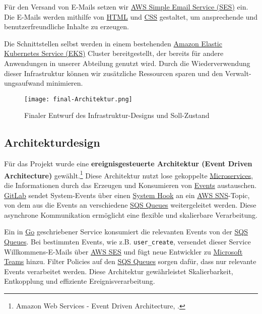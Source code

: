 Für den Versand von E-Mails setzen wir \hyperlink{SES}{\textcolor{AOBlau}{AWS Simple Email Service (SES)}} ein. Die E-Mails werden mithilfe von \hyperlink{HTML}{\textcolor{AOBlau}{HTML}} und \hyperlink{CSS}{\textcolor{AOBlau}{CSS}} gestaltet, um ansprechende und benutzerfreundliche Inhalte zu erzeugen.

Die Schnittstellen selbst werden in einem bestehenden \hyperlink{EKS}{\textcolor{AOBlau}{Amazon Elastic Kubernetes Service (EKS)}} Cluster bereitgestellt, der bereits für andere Anwendungen in unserer Abteilung genutzt wird. Durch die Wiederverwendung dieser Infrastruktur können wir zusätzliche Ressourcen sparen und den Verwalt-
ungsaufwand minimieren.

\begin{figure}[H]
	\centering
	\texttt{[image: final-Architektur.png]}
	\caption{Finaler Entwurf des Infrastruktur-Designs und Soll-Zustand}
\end{figure}

\clearpage
\subsection{Architekturdesign}
\label{sec:Architekturdesign}

Für das Projekt wurde eine \textbf{ereignisgesteuerte Architektur (Event Driven Architecture)} gewählt.\footnote{Amazon Web Services - Event Driven Architecture, \cite{awsEDA}.} Diese Architektur nutzt lose gekoppelte \hyperlink{Microservices}{\textcolor{AOBlau}{Microservices}}, die Informationen durch das Erzeugen und Konsumieren von \hyperlink{GitLabEvent}{\textcolor{AOBlau}{Events}} austauschen. \hyperlink{GitLab}{\textcolor{AOBlau}{GitLab}} sendet System-Events über einen \hyperlink{GitLabSystemhooks}{\textcolor{AOBlau}{System Hook}} an ein \hyperlink{SNS}{\textcolor{AOBlau}{AWS SNS}}-Topic, von dem aus die Events an verschiedene \hyperlink{SQS}{\textcolor{AOBlau}{SQS Queues}} weitergeleitet werden. Diese asynchrone Kommunikation ermöglicht eine flexible und skalierbare Verarbeitung.

Ein in \hyperlink{Go}{\textcolor{AOBlau}{Go}} geschriebener Service konsumiert die relevanten Events von der \hyperlink{SQS}{\textcolor{AOBlau}{SQS Queues}}. Bei bestimmten Events, wie z.B. \texttt{user\_create}, versendet dieser Service Willkommens-E-Mails über \hyperlink{SES}{\textcolor{AOBlau}{AWS SES}} und fügt neue Entwickler zu \hyperlink{MicrosoftTeams}{\textcolor{AOBlau}{Microsoft Teams}} hinzu. Filter Policies auf den \hyperlink{SQS}{\textcolor{AOBlau}{SQS Queues}} sorgen dafür, dass nur relevante Events verarbeitet werden. Diese Architektur gewährleistet Skalierbarkeit, Entkopplung und effiziente Ereignisverarbeitung.

